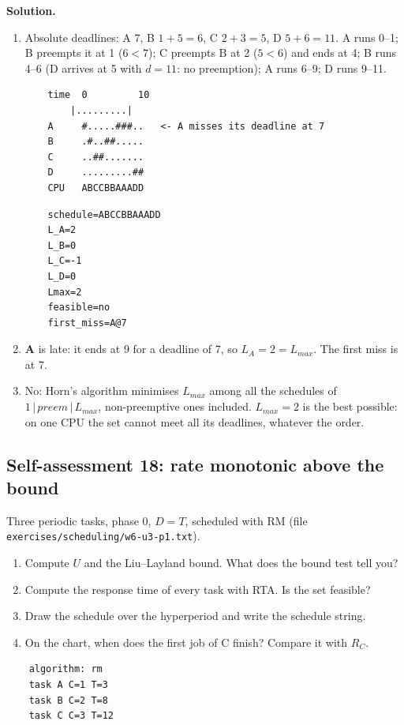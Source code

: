 \textbf{Solution.}
\begin{enumerate}
    \item Absolute deadlines: A 7, B $1 + 5 = 6$, C $2 + 3 = 5$, D $5 + 6 = 11$. A runs 0--1; B preempts it at 1 ($6 < 7$); C preempts B at 2 ($5 < 6$) and ends at 4; B runs 4--6 (D arrives at 5 with $d = 11$: no preemption); A runs 6--9; D runs 9--11.
\begin{verbatim}
    time  0         10
        |.........|
    A     #.....###..   <- A misses its deadline at 7
    B     .#..##.....
    C     ..##.......
    D     .........##
    CPU   ABCCBBAAADD
\end{verbatim}
\begin{verbatim}
    schedule=ABCCBBAAADD
    L_A=2
    L_B=0
    L_C=-1
    L_D=0
    Lmax=2
    feasible=no
    first_miss=A@7
\end{verbatim}
    \item \textbf{A} is late: it ends at 9 for a deadline of 7, so $L_A = 2 = L_{max}$. The first miss is at 7.
    \item No: Horn's algorithm minimises $L_{max}$ among all the schedules of $1 \,|\, \textit{preem} \,|\, L_{max}$, non-preemptive ones included. $L_{max} = 2$ is the best possible: on one CPU the set cannot meet all its deadlines, whatever the order.
\end{enumerate}

\subsection*{Self-assessment 18: rate monotonic above the bound}
Three periodic tasks, phase 0, $D = T$, scheduled with RM (file \texttt{exercises/scheduling/w6-u3-p1.txt}).
\begin{enumerate}
    \item Compute $U$ and the Liu--Layland bound. What does the bound test tell you?
    \item Compute the response time of every task with RTA. Is the set feasible?
    \item Draw the schedule over the hyperperiod and write the schedule string.
    \item On the chart, when does the first job of C finish? Compare it with $R_C$.
\end{enumerate}
\begin{lstlisting}
    algorithm: rm
    task A C=1 T=3
    task B C=2 T=8
    task C C=3 T=12
\end{lstlisting}

